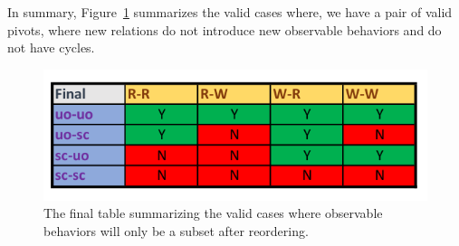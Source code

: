     In summary, Figure~\ref{reord:final_table} summarizes the valid cases where, we have a pair of valid pivots, where new relations do not introduce new observable behaviors and do not have cycles. 
    \begin{figure}[H]
        \centering
        \includegraphics[scale=0.7]{4.InstructionReordering/4.ValidReorderingCandidate/part4_table.pdf}
        \caption{The final table summarizing the valid cases where observable behaviors will only be a subset after reordering.}
        \label{reord:final_table}
    \end{figure}
